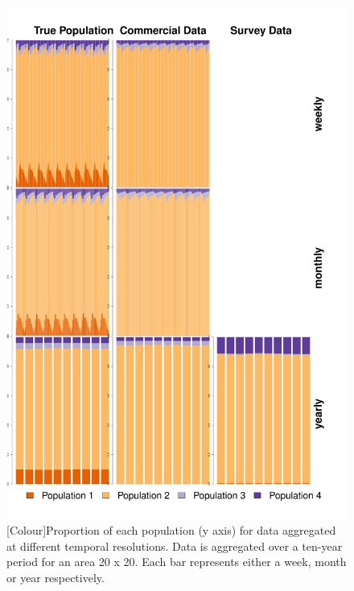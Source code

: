 \documentclass[review]{elsarticle}
\begin{document}
\begin{figure}[!ht]
	\includegraphics[width=\linewidth]{../analysis/Data_Aggregation_time_Rev2}
	\caption{[Colour]Proportion of each population (y axis) for data aggregated at
		different temporal resolutions. Data is aggregated over a
		ten-year period for an area 20 x 20. Each bar represents either
		a week, month or year respectively.}
	\label{fig:2}
\end{figure}	
\end{document}
